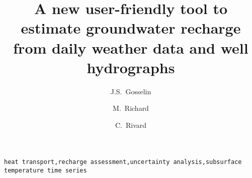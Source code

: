 \documentclass[3p, times, review]{elsarticle} %
\begin{document}
\begin{frontmatter}

\title{A new user-friendly tool to estimate groundwater recharge from daily weather data and well hydrographs}

\author[inrs]{J.S.~Gosselin}

\author[inrs]{M.~Richard}

\author[cgc]{C.~Rivard}



\address[inrs]{Institut national de la recherche scientifique, Centre Eau Terre Environnement,
490 rue de la Couronne, Quebec City, Quebec, Canada}
\address[cgc]{Geological Survey of Canada, Quebec Division, 490 rue de la Couronne, Quebec City, Quebec, Canada}

\begin{abstract}
	\vspace{-1em}
	
\end{abstract}

\begin{keyword}
\texttt{heat transport\sep recharge assessment\sep uncertainty analysis\sep subsurface temperature time series}
\end{keyword}

\end{frontmatter}

\linenumbers
\end{document}
